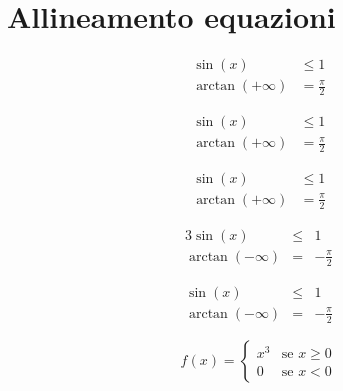\documentclass[]{article}
\begin{document}
\section*{Allineamento equazioni}
	\begin{align}
		\sin(x) & \leq 1 \\
		\arctan(+\infty) & = \frac{\pi}{2}
	\end{align}

	\begin{subequations}
		\begin{align}
			\sin(x) & \leq 1 \\
			\arctan(+\infty) & = \frac{\pi}{2}
		\end{align}
	\end{subequations}

	\[
		\begin{aligned}
			\sin(x) & \leq 1 \\
			\arctan(+\infty) & = \frac{\pi}{2}
		\end{aligned}
	\]

	\begin{alignat}{3}
		\sin(x) & \leq &  1 \\
		\arctan(-\infty) & = & - \frac{\pi}{2}
	\end{alignat}

	\[
		\begin{alignedat}{3}
			\sin(x) & \leq & 1 \\
			\arctan(-\infty) & = & - \frac{\pi}{2}
		\end{alignedat}
	\]

	\begin{equation}
		f(x) = 
		\begin{cases}
		x^3 & \text{se } x \geq 0 \\
		0 & \text{se } x < 0
		\end{cases}
	\end{equation}
\end{document}
